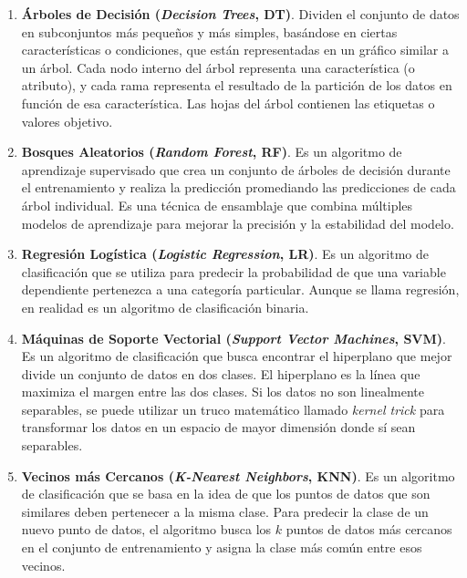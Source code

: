 \begin{enumerate}
    \item \textbf{Árboles de Decisión (\textit{Decision Trees}, DT)}. Dividen el conjunto de datos
    en subconjuntos más pequeños y más simples, basándose en ciertas características o condiciones,
    que están representadas en un gráfico similar a un árbol. Cada nodo interno del árbol
    representa una característica (o atributo), y cada rama representa el resultado de la
    partición de los datos en función de esa característica. Las hojas del árbol contienen las
    etiquetas o valores objetivo.\\
    \item \textbf{Bosques Aleatorios (\textit{Random Forest}, RF)}. Es un algoritmo de aprendizaje
    supervisado que crea un conjunto de árboles de decisión durante el entrenamiento y realiza
    la predicción promediando las predicciones de cada árbol individual. Es una técnica de
    ensamblaje que combina múltiples modelos de aprendizaje para mejorar la precisión y la
    estabilidad del modelo.\\
    \item \textbf{Regresión Logística (\textit{Logistic Regression}, LR)}. Es un algoritmo de
    clasificación que se utiliza para predecir la probabilidad de que una variable dependiente
    pertenezca a una categoría particular. Aunque se llama regresión, en realidad es un algoritmo
    de clasificación binaria.\\
    \item \textbf{Máquinas de Soporte Vectorial (\textit{Support Vector Machines}, SVM)}. Es un
    algoritmo de clasificación que busca encontrar el hiperplano que mejor divide un conjunto de
    datos en dos clases. El hiperplano es la línea que maximiza el margen entre las dos clases. Si
    los datos no son linealmente separables, se puede utilizar un truco matemático llamado
    \textit{kernel trick} para transformar los datos en un espacio de mayor dimensión donde sí
    sean separables.\\
    \item \textbf{Vecinos más Cercanos (\textit{K-Nearest Neighbors}, KNN)}. Es un algoritmo de
    clasificación que se basa en la idea de que los puntos de datos que son similares deben
    pertenecer a la misma clase. Para predecir la clase de un nuevo punto de datos, el algoritmo
    busca los $k$ puntos de datos más cercanos en el conjunto de entrenamiento y asigna la clase
    más común entre esos vecinos.\\

\end{enumerate}
